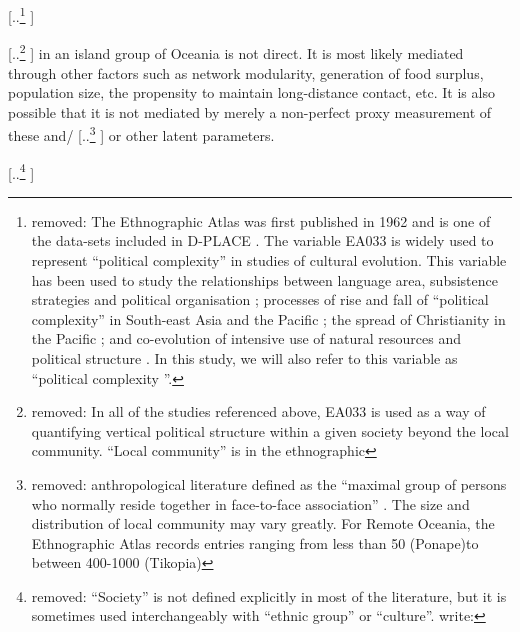 \documentclass[unnumsec,webpdf,modern,medium]{oup-authoring-template}
\providecommand{\DIFaddtex}[1]{{\protect\color{blue} \sf #1}} %
\providecommand{\DIFdeltex}[1]{{\protect\color{red} [..\footnote{removed: #1} ]}} %
\providecommand{\DIFaddbegin}{} %
\providecommand{\DIFaddend}{} %
\providecommand{\DIFdelbegin}{} %
\providecommand{\DIFdelend}{} %
\providecommand{\DIFadd}[1]{\texorpdfstring{\DIFaddtex{#1}}{#1}} %
\providecommand{\DIFdel}[1]{\texorpdfstring{\DIFdeltex{#1}}{}} %
\newcommand{\DIFscaledelfig}{0.5}
\newlength{\DIFdelgraphicswidth} %
\newlength{\DIFdelgraphicsheight} %
\newcommand{\DIFaddincludegraphics}[2][]{{\color{blue}\fbox{\DIFOincludegraphics[#1]{#2}}}} %
\newcommand{\DIFdelincludegraphics}[2][]{%
\sbox{\DIFdelgraphicsbox}{\DIFOincludegraphics[#1]{#2}}%
\settoboxwidth{\DIFdelgraphicswidth}{\DIFdelgraphicsbox} %
\settoboxtotalheight{\DIFdelgraphicsheight}{\DIFdelgraphicsbox} %
\scalebox{\DIFscaledelfig}{%
\parbox[b]{\DIFdelgraphicswidth}{\usebox{\DIFdelgraphicsbox}\\[-\baselineskip] \rule{\DIFdelgraphicswidth}{0em}}\llap{\resizebox{\DIFdelgraphicswidth}{\DIFdelgraphicsheight}{%
\setlength{\unitlength}{\DIFdelgraphicswidth}%
\begin{picture}(1,1)%
\thicklines\linethickness{2pt} %
{\color[rgb]{1,0,0}\put(0,0){\framebox(1,1){}}}%
{\color[rgb]{1,0,0}\put(0,0){\line( 1,1){1}}}%
{\color[rgb]{1,0,0}\put(0,1){\line(1,-1){1}}}%
\end{picture}%
}\hspace*{3pt}}} %
} %
\DeclareRobustCommand{\DIFaddbegin}{\DIFOaddbegin \let\includegraphics\DIFaddincludegraphics} %
\DeclareRobustCommand{\DIFaddend}{\DIFOaddend \let\includegraphics\DIFOincludegraphics} %
\DeclareRobustCommand{\DIFdelbegin}{\DIFOdelbegin \let\includegraphics\DIFdelincludegraphics} %
\DeclareRobustCommand{\DIFdelend}{\DIFOaddend \let\includegraphics\DIFOincludegraphics} %
\begin{document}
\DIFdel{The Ethnographic Atlas was first published in 1962 and is one of the data-sets included in D-PLACE \citep{d_place_all}. The variable EA033 is widely used to represent ``political complexity'' in studies of cultural evolution. This variable has been used to study the relationships between language area, subsistence strategies and political organisation \citep{curriemace2009}; processes of rise and fall of ``political complexity'' in South-east Asia and the Pacific \citep{currie2010rise}; the spread of Christianity in the Pacific \citep{watts_2018}; and co-evolution of intensive use of natural resources and political structure \citep{sheehan2018coevolution}. In this study, we will also refer to this variable as ``political complexity ''. }%

\DIFdel{In all of the studies referenced above, EA033 is used as a way of quantifying vertical political structure within a given society beyond the local community. ``Local community'' is in the ethnographic}\DIFdelend \DIFaddbegin \DIFadd{in an island group of Oceania is not direct. It is most likely mediated through other factors such as network modularity, generation of food surplus, population size, the propensity to maintain long-distance contact, etc. It is also possible that it is not mediated by merely a non-perfect proxy measurement of these and}\DIFaddend /\DIFdelbegin \DIFdel{anthropological literature defined as the ``maximal group of persons who normally reside together in face-to-face association'' \citep{yale1945outline}. The size and distribution of local community may vary greatly. For Remote Oceania, the Ethnographic Atlas records entries ranging from less than 50 (Ponape)to between 400-1000 (Tikopia)}\DIFdelend \DIFaddbegin \DIFadd{or other latent parameters}\DIFaddend .

\DIFdelbegin \DIFdel{``Society'' is not defined explicitly in most of the literature, but it is sometimes used interchangeably with ``ethnic group'' or ``culture''. \citet{roger1981cultural} write:
}%
\end{document}
